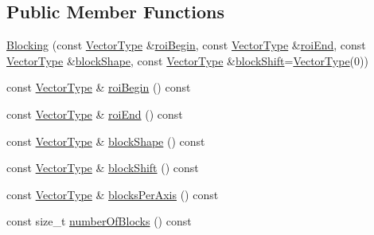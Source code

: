 \subsection*{Public Member Functions}
\begin{DoxyCompactItemize}
\item 
\hyperlink{classnifty_1_1tools_1_1Blocking_a72c8db4f834fd774f6a50e03ef4b30c2}{Blocking} (const \hyperlink{classnifty_1_1tools_1_1Blocking_a5f8df3d4cdf09803217d729a04018fb3}{Vector\+Type} \&\hyperlink{classnifty_1_1tools_1_1Blocking_a75ee7d62178b93c523a0837420c71895}{roi\+Begin}, const \hyperlink{classnifty_1_1tools_1_1Blocking_a5f8df3d4cdf09803217d729a04018fb3}{Vector\+Type} \&\hyperlink{classnifty_1_1tools_1_1Blocking_a00f640413cd3c041bb364f8a951b57a9}{roi\+End}, const \hyperlink{classnifty_1_1tools_1_1Blocking_a5f8df3d4cdf09803217d729a04018fb3}{Vector\+Type} \&\hyperlink{classnifty_1_1tools_1_1Blocking_a55d8a6beaa2a62592e3d0901ebad179b}{block\+Shape}, const \hyperlink{classnifty_1_1tools_1_1Blocking_a5f8df3d4cdf09803217d729a04018fb3}{Vector\+Type} \&\hyperlink{classnifty_1_1tools_1_1Blocking_a5a7d530f0939a37698d96f9d846e5d4d}{block\+Shift}=\hyperlink{classnifty_1_1tools_1_1Blocking_a5f8df3d4cdf09803217d729a04018fb3}{Vector\+Type}(0))
\item 
const \hyperlink{classnifty_1_1tools_1_1Blocking_a5f8df3d4cdf09803217d729a04018fb3}{Vector\+Type} \& \hyperlink{classnifty_1_1tools_1_1Blocking_a75ee7d62178b93c523a0837420c71895}{roi\+Begin} () const 
\item 
const \hyperlink{classnifty_1_1tools_1_1Blocking_a5f8df3d4cdf09803217d729a04018fb3}{Vector\+Type} \& \hyperlink{classnifty_1_1tools_1_1Blocking_a00f640413cd3c041bb364f8a951b57a9}{roi\+End} () const 
\item 
const \hyperlink{classnifty_1_1tools_1_1Blocking_a5f8df3d4cdf09803217d729a04018fb3}{Vector\+Type} \& \hyperlink{classnifty_1_1tools_1_1Blocking_a55d8a6beaa2a62592e3d0901ebad179b}{block\+Shape} () const 
\item 
const \hyperlink{classnifty_1_1tools_1_1Blocking_a5f8df3d4cdf09803217d729a04018fb3}{Vector\+Type} \& \hyperlink{classnifty_1_1tools_1_1Blocking_a5a7d530f0939a37698d96f9d846e5d4d}{block\+Shift} () const 
\item 
const \hyperlink{classnifty_1_1tools_1_1Blocking_a5f8df3d4cdf09803217d729a04018fb3}{Vector\+Type} \& \hyperlink{classnifty_1_1tools_1_1Blocking_a4763abb276fd7f75d6e7fdb08b93247e}{blocks\+Per\+Axis} () const 
\item 
const size\+\_\+t \hyperlink{classnifty_1_1tools_1_1Blocking_af52a753b4284b016de2de931427a0314}{number\+Of\+Blocks} () const 

\end{DoxyCompactItemize}
